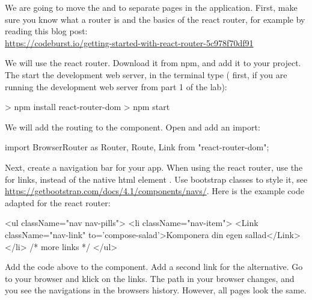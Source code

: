 \documentclass[fleqn, article, a4paper]{memoir}
\begin{document}
\begin{Assignments}

\item We are going to move the  and  to separate pages in the application. First, make sure you know what a router is and the basics of the react router, for example by reading this blog post: 
\\ \url{https://codeburst.io/getting-started-with-react-router-5c978f70df91}

\item We will use the react router. Download it from npm, and add it to your project. The start the development web server, in the terminal type ( first, if you are running the development web server from part 1 of the lab):
\begin{Code}
> npm install react-router-dom
> npm start
\end{Code}

\item We will add the routing to the  component. Open  and add an import:
\begin{Code}
import { BrowserRouter as Router, Route, Link } from "react-router-dom";
\end{Code}

\item Next, create a navigation bar for your app. When using the react router, use the  for links, instead of the native html element . Use bootstrap classes to style it, see \url{https://getbootstrap.com/docs/4.1/components/navs/}. Here is the example code adapted for the react router:
\begin{Code}
<ul className="nav nav-pills">
  <li className="nav-item">
    <Link className="nav-link" to='compose-salad'>Komponera din egen sallad</Link>
  </li>
  {/* more links */}
</ul>
\end{Code}
Add the code above to the  component. Add a second link for the  alternative. Go to your browser and klick on the links. The path in your browser changes, and you see the navigations in the browsers history. However, all pages look the same.


\end{Assignments}
\end{document}
